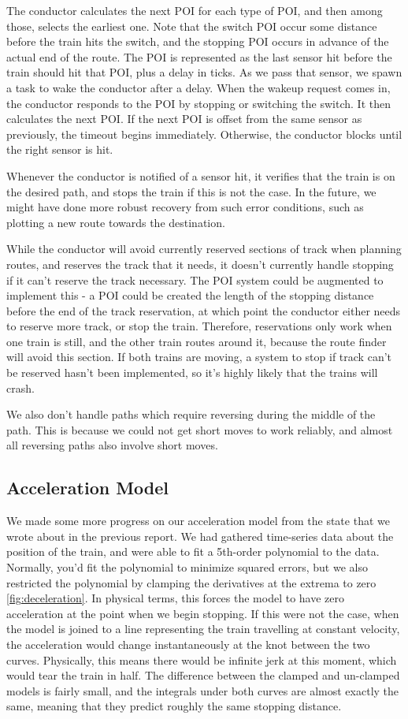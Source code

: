 \documentclass{article}
\begin{document}
The conductor calculates the next POI for each type of POI, and then among those, selects the earliest one.
Note that the switch POI occur some distance before the train hits the switch,
and the stopping POI occurs in advance of the actual end of the route.
The POI is represented as the last sensor hit before the train should hit that POI, plus a delay in ticks.
As we pass that sensor, we spawn a task to wake the conductor after a delay.
When the wakeup request comes in, the conductor responds to the POI by stopping or switching the switch.
It then calculates the next POI\@.
If the next POI is offset from the same sensor as previously, the timeout begins immediately.
Otherwise, the conductor blocks until the right sensor is hit.

Whenever the conductor is notified of a sensor hit, it verifies that the train is on the desired path, and stops
the train if this is not the case.
In the future, we might have done more robust recovery from such error conditions, such as plotting a new route towards
the destination.

While the conductor will avoid currently reserved sections of track when planning routes, and reserves the track
that it needs, it doesn't currently handle stopping if it can't reserve the track necessary.
The POI system could be augmented to implement this - a POI could be created the length of the stopping distance before the
end of the track reservation, at which point the conductor either needs to reserve more track, or stop the train.
Therefore, reservations only work when one train is still, and the other train routes around it,
because the route finder will avoid this section.
If both trains are moving, a system to stop if track can't be reserved hasn't been implemented,
so it's highly likely that the trains will crash.

We also don't handle paths which require reversing during the middle of the path.
This is because we could not get short moves to work reliably,
and almost all reversing paths also involve short moves.

\subsection{Acceleration Model}
We made some more progress on our acceleration model from the state that we wrote about in the previous report.
We had gathered time-series data about the position of the train, and were able to fit a 5th-order polynomial to
the data.
Normally, you'd fit the polynomial to minimize squared errors, but we also restricted the polynomial by clamping
the derivatives at the extrema to zero \ref{fig:deceleration}.
In physical terms, this forces the model to have zero acceleration at the point
when we begin stopping.
If this were not the case, when the model is joined to a line representing
the train travelling at constant velocity, the acceleration would change instantaneously
at the knot between the two curves.
Physically, this means there would be infinite jerk at this moment, which would tear the
train in half.
The difference between the clamped and un-clamped models is fairly small, and the
integrals under both curves are almost exactly the same, meaning that they predict
roughly the same stopping distance.
\end{document}
